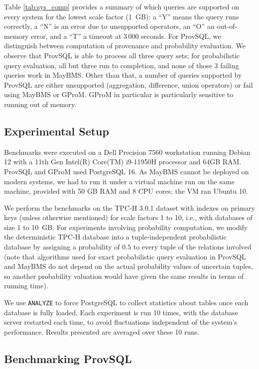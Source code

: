 Table \ref{tab:sys_comp} provides a summary of which
queries are supported on every system for the lowest scale factor (1~GB):
a ``Y'' means the query runs correctly, a ``N'' is an error due to
unsupported operators, an ``O'' an out-of-memory error, and a ``T'' a
timeout at 3\,000 seconds. For ProvSQL, we distinguish between
computation of provenance and probability evaluation. We observe that
ProvSQL is able to process all three query sets; for probabilistic query
evaluation, all but three run to completion, and none of those 3 failing
queries work
in MayBMS. Other than that, a number of queries supported by ProvSQL are
either unsupported (aggregation, difference, union operators) or fail
using MayBMS or GProM. GProM in particular is particularly sensitive to
running out of memory.

\subsection{Experimental Setup}
Benchmarks were executed on a Dell Precision 7560 workstation running Debian 12
with a 11th Gen Intel(R) Core(TM) i9-11950H processor and 64GB RAM. ProvSQL and GProM used PostgreSQL 16. As MayBMS cannot be
deployed on modern systems, we had to run it under a virtual machine run
on the same machine, provided with 50 GB RAM and 8 CPU cores; the VM ran
Ubuntu 10.

We perform the benchmarks on the TPC-H 3.0.1 dataset with indexes on primary
keys (unless otherwise mentioned) for scale factors 1 to
10, i.e., with databases of size 1 to 10~GB. For experiments involving
probability computation, we modify the deterministic TPC-H database into a
tuple-independent probabilistic database by assigning a probability of
$0.5$ to every tuple of the relations involved (note that algorithms used
for exact probabilistic query evaluation in ProvSQL and MayBMS do not
depend on the actual probability values of uncertain tuples, so another
probability valuation would have given the same results in terms of
running time).

We use \texttt{ANALYZE} to force PostgreSQL to collect
statistics about tables once each database is fully loaded.
Each experiment is run 10 times, with the database server restarted
each time, to avoid fluctuations
independent of the system's performance. Results presented are
averaged over these 10 runs.

\subsection{Benchmarking ProvSQL}

